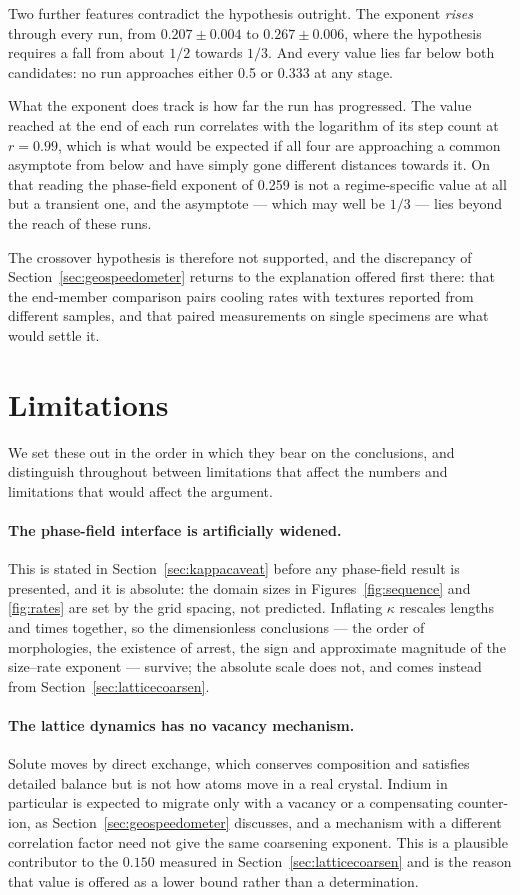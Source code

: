 \documentclass[11pt,a4paper]{article}
\begin{document}
Two further features contradict the hypothesis outright. The exponent
\emph{rises} through every run, from $0.207 \pm 0.004$ to $0.267 \pm 0.006$,
where the hypothesis requires a fall from about $1/2$ towards $1/3$. And every
value lies far below both candidates: no run approaches either 0.5 or 0.333 at
any stage.

What the exponent does track is how far the run has progressed. The value
reached at the end of each run correlates with the logarithm of its step count
at $r = 0.99$, which is what would be expected if all four are approaching a
common asymptote from below and have simply gone different distances towards
it. On that reading the phase-field exponent of 0.259 is not a regime-specific
value at all but a transient one, and the asymptote --- which may well be
$1/3$ --- lies beyond the reach of these runs.

The crossover hypothesis is therefore not supported, and the discrepancy of
Section~\ref{sec:geospeedometer} returns to the explanation offered first
there: that the end-member comparison pairs cooling rates with textures
reported from different samples, and that paired measurements on single
specimens are what would settle it.

\section{Limitations}
\label{sec:limitations}

We set these out in the order in which they bear on the conclusions, and
distinguish throughout between limitations that affect the numbers and
limitations that would affect the argument.

\paragraph{The phase-field interface is artificially widened.} This is stated
in Section~\ref{sec:kappacaveat} before any phase-field result is presented, and
it is absolute: the domain sizes in Figures~\ref{fig:sequence} and
\ref{fig:rates} are set by the grid spacing, not predicted. Inflating $\kappa$
rescales lengths and times together, so the dimensionless conclusions --- the
order of morphologies, the existence of arrest, the sign and approximate
magnitude of the size--rate exponent --- survive; the absolute scale does not,
and comes instead from Section~\ref{sec:latticecoarsen}.

\paragraph{The lattice dynamics has no vacancy mechanism.} Solute moves by
direct exchange, which conserves composition and satisfies detailed balance but
is not how atoms move in a real crystal. Indium in particular is expected to
migrate only with a vacancy or a compensating counter-ion, as
Section~\ref{sec:geospeedometer} discusses, and a mechanism with a different
correlation factor need not give the same coarsening exponent. This is a
plausible contributor to the $0.150$ measured in Section~\ref{sec:latticecoarsen}
and is the reason that value is offered as a lower bound rather than a
determination.
\end{document}
